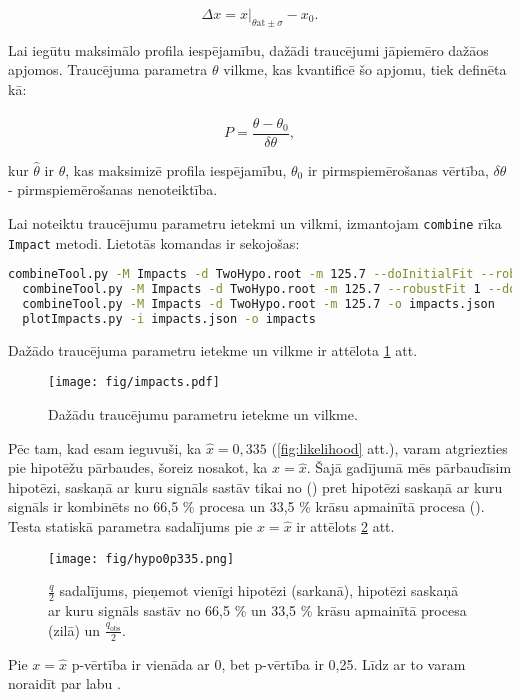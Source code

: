 \begin{equation}
  \Delta x = x\bigg\rvert_{\theta \text{at} \pm\sigma}-x_{0}.
\end{equation} 

Lai iegūtu maksimālo profila iespējamību, dažādi traucējumi jāpiemēro dažāos apjomos. Traucējuma parametra $\theta$ vilkme, kas kvantificē šo apjomu, tiek definēta kā:

\begin{equation}
  P = \frac{\hat{\theta}-\theta_{0}}{\delta\theta},
\end{equation} 

kur $\hat{\theta}$ ir $\theta$, kas maksimizē profila iespējamību, $\theta_{0}$ ir pirmspiemērošanas vērtība, $\delta\theta$ - pirmspiemērošanas nenoteiktība.

Lai noteiktu traucējumu parametru ietekmi un vilkmi, izmantojam \lstinline[language=sh]|combine| rīka \lstinline[language=sh]|Impact| metodi. Lietotās komandas ir sekojošas:

\begin{lstlisting}[language=sh]
  combineTool.py -M Impacts -d TwoHypo.root -m 125.7 --doInitialFit --robustFit 1
  combineTool.py -M Impacts -d TwoHypo.root -m 125.7 --robustFit 1 --doFits
  combineTool.py -M Impacts -d TwoHypo.root -m 125.7 -o impacts.json
  plotImpacts.py -i impacts.json -o impacts
\end{lstlisting}

Dažādo traucējuma parametru ietekme un vilkme ir attēlota \ref{fig:impacts} att.

\begin{figure}
  \centering
  \texttt{[image: fig/impacts.pdf]}
  \caption{Dažādu traucējumu parametru ietekme un vilkme.}
  \label{fig:impacts}
\end{figure}

Pēc tam, kad esam ieguvuši, ka $\hat{x}=0,335$ (\ref{fig:likelihood} att.), varam atgriezties pie hipotēžu pārbaudes, šoreiz nosakot, ka $x=\hat{x}$. Šajā gadījumā mēs pārbaudīsim hipotēzi, saskaņā ar kuru signāls sastāv tikai no \ttbar (\Hnull) pret hipotēzi saskaņā ar kuru signāls ir kombinēts no 66,5 \% \ttbar procesa un 33,5 \% krāsu apmainītā \ttbar procesa (\Halt). Testa statiskā parametra sadalījums pie $x=\hat{x}$ ir attēlots \ref{fig:hypo0p335} att.

\begin{figure}
  \centering
  \texttt{[image: fig/hypo0p335.png]}
  \caption{$\frac{q}{2}$ sadalījums, pieņemot vienīgi \ttbar hipotēzi (sarkanā), hipotēzi saskaņā ar kuru signāls sastāv no 66,5 \% \ttbar un 33,5 \% krāsu apmainītā \ttbar procesa (zilā) un $\frac{q_{\text{obs}}}{2}$.}
  \label{fig:hypo0p335}
\end{figure}

Pie $x=\hat{x}$ \Hnull p-vērtība ir vienāda ar 0, bet \Halt p-vērtība ir 0,25. Līdz ar to varam noraidīt \Hnull par labu \Halt.
